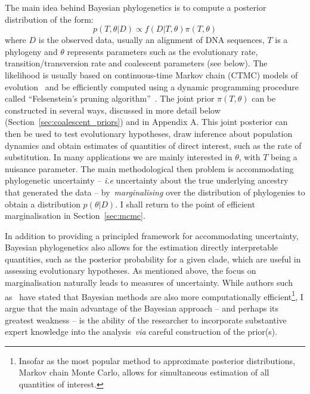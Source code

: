 The main idea behind Bayesian phylogenetics is to compute a posterior distribution of the form:
\begin{equation}
 \label{eq:phylo_post_simple}
 p(T, \theta | D) \propto f(D| T, \theta)\pi(T, \theta)
\end{equation}
where $D$ is the observed data, usually an alignment of DNA sequences, $T$ is a phylogeny and $\theta$ represents parameters such as the evolutionary rate, transition/transversion rate and coalescent parameters (see below).
The likelihood is usually based on continuous-time Markov chain (CTMC) models of evolution~\citep{Hasegawa1985,Tavare1986} and be efficiently computed using a dynamic programming  procedure called ``Felsenstein's pruning algorithm''~\citep{Felsenstein1981}.
The joint prior $\pi(T, \theta)$ can be constructed in several ways, discussed in more detail below (Section~\ref{sec:coalescent_priors}) and in Appendix A.
This joint posterior can then be used to test evolutionary hypotheses, draw inference about population dynamics and obtain estimates of quantities of direct interest, such as the rate of substitution.
In many applications we are mainly interested in $\theta$, with $T$ being a nuisance parameter.
The main methodological then problem is accommodating phylogenetic uncertainty -- \textit{i.e} uncertainty about the true underlying ancestry that generated the data -- by~\textit{marginalising} over the distribution of phylogenies to obtain a distribution $p(\theta | D)$.
I shall return to the point of efficient marginalisation in Section~\ref{sec:mcmc}.

In addition to providing a principled framework for accommodating uncertainty, Bayesian phylogenetics also allows for the estimation directly interpretable  quantities, such as the posterior probability for a given clade, which are useful in assessing evolutionary hypotheses.
As mentioned above, the focus on marginalisation naturally leads to measures of uncertainty.
While authors such as~\cite{Huelsenbeck2002} have stated that Bayesian methods are also more computationally efficient\footnote{Insofar as the most popular method to approximate posterior distributions, Markov chain Monte Carlo, allows for simultaneous estimation of all quantities of interest.}, I argue that the main advantage of the Bayesian approach -- and perhaps its greatest weakness -- is the ability of the researcher to incorporate substantive expert knowledge into the analysis~\textit{via} careful construction of the prior(s).


